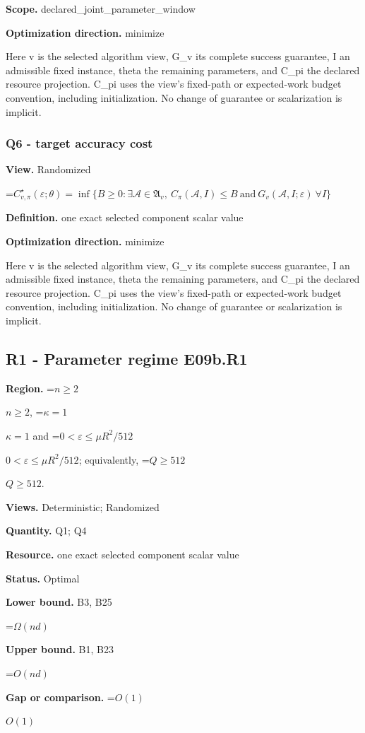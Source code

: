 \documentclass[10pt,a4paper]{article}
\newcommand{\AtlasMath}[1]{\par\begingroup\centering\setbox0=\hbox{$\displaystyle #1$}\ifdim\wd0>1.4\linewidth\typeout{ATLAS WIDE FORMULA: \the\wd0}\fi\ifdim\wd0>\linewidth\resizebox{\linewidth}{!}{\box0}\else\box0\fi\par\endgroup}
\newcommand{\AtlasInlineMath}[1]{\begingroup\setbox0=\hbox{$#1$}\ifdim\wd0>.4\linewidth\endgroup\AtlasMath{#1}\else\endgroup$#1$\fi}
\begin{document}
\textbf{Scope.} declared\_joint\_parameter\_window

\textbf{Optimization direction.} minimize

Here v is the selected algorithm view, G\_v its complete success guarantee, I an admissible fixed instance, theta the remaining parameters, and C\_pi the declared resource projection. C\_pi uses the view's fixed-path or expected-work budget convention, including initialization. No change of guarantee or scalarization is implicit.

\subsubsection{Q6 - target accuracy cost}
\textbf{View.} Randomized

\AtlasMath{C^\star_{v,\pi}(\varepsilon;\theta)=\inf\{B\ge0:\exists\mathcal A\in\mathfrak A_v,\ C_\pi(\mathcal A,I)\le B\ \text{and}\ G_v(\mathcal A,I;\varepsilon)\ \forall I\}}
\textbf{Definition.} one exact selected component scalar value

\textbf{Optimization direction.} minimize

Here v is the selected algorithm view, G\_v its complete success guarantee, I an admissible fixed instance, theta the remaining parameters, and C\_pi the declared resource projection. C\_pi uses the view's fixed-path or expected-work budget convention, including initialization. No change of guarantee or scalarization is implicit.

\subsection{R1 - Parameter regime E09b.R1}
\textbf{Region.} \AtlasInlineMath{n\ge2}, \AtlasInlineMath{\kappa=1} and \AtlasInlineMath{0<\varepsilon\le\mu R^2/512}; equivalently, \AtlasInlineMath{Q\ge512}.

\textbf{Views.} Deterministic; Randomized

\textbf{Quantity.} Q1; Q4

\textbf{Resource.} one exact selected component scalar value

\textbf{Status.} Optimal

\textbf{Lower bound.} B3, B25

\AtlasMath{\Omega(nd)}
\textbf{Upper bound.} B1, B23

\AtlasMath{O(nd)}
\textbf{Gap or comparison.} \AtlasInlineMath{O(1)}
\end{document}
